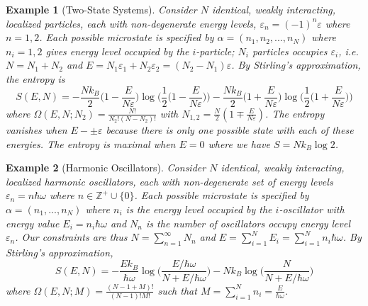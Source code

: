 \documentclass[a4paper]{article}
\newtheorem{eg}{Example}[section]
\theoremstyle{new}
\begin{document}
\begin{eg}[Two-State Systems]
Consider $N$ identical, weakly interacting, localized particles, each with non-degenerate energy levels, $\varepsilon_n=(-1)^n\varepsilon$ where $n=1,2$. Each possible microstate is specified by $\alpha=(n_1,n_2,...,n_N)$ where $n_i=1,2$ gives energy level occupied by the $i$-particle; $N_i$ particles occupies $\varepsilon_i$, i.e. $N=N_1+N_2$ and $E=N_1\varepsilon_1+N_2\varepsilon_2=(N_2-N_1)\varepsilon$. By Stirling's approximation, the entropy is
$$S(E,N)=-\frac{Nk_B}{2}\bigg(1-\frac{E}{N\varepsilon}\bigg)\log\bigg(\frac{1}{2}\bigg(1-\frac{E}{N\varepsilon}\bigg)\bigg)-\frac{Nk_B}{2}\bigg(1+\frac{E}{N\varepsilon}\bigg)\log\bigg(\frac{1}{2}\bigg(1+\frac{E}{N\varepsilon}\bigg)\bigg)$$
where $\Omega(E,N;N_2)=\frac{N!}{N_2!(N-N_2)!}$ with $N_{1,2}=\frac{N}{2}(1\mp\frac{E}{N\varepsilon})$. The entropy vanishes when $E-\pm\varepsilon$ because there is only one possible state with each of these energies. The entropy is maximal when $E=0$ where we
have $S = N k_B\log2$.
\end{eg}
\begin{eg}[Harmonic Oscillators]
Consider $N$ identical, weakly interacting, localized harmonic oscillators, each with non-degenerate set of energy levels $\varepsilon_n=n\hbar\omega$ where $n\in\mathbb{Z}^+\cup\{0\}$. Each possible microstate is specified by $\alpha=(n_1,...,n_N)$ where $n_i$ is the energy level occupied by the $i$-oscillator with energy value $E_i=n_i\hbar\omega$ and $N_n$ is the number of oscillators occupy energy level $\varepsilon_n$. Our constraints are thus $N=\sum_{n=1}^\infty N_n$ and $E=\sum_{i=1}^NE_i=\sum_{i=1}^Nn_i\hbar\omega$. By Stirling's approximation,
$$S(E,N)=-\frac{Ek_B}{\hbar\omega}\log\bigg(\frac{E/\hbar\omega}{N+E/\hbar\omega}\bigg)-Nk_B\log\bigg(\frac{N}{N+E/\hbar\omega}\bigg)$$
where $\Omega(E,N;M)=\frac{(N-1+M)!}{(N-1)!M!}$ such that $M=\sum_{i=1}^Nn_i=\frac{E}{\hbar\omega}$.
\end{eg}
\newpage
\end{document}
